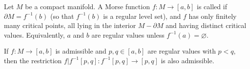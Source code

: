 Let $M$ be a compact manifold. A Morse function $f: M \rightarrow [a, b]$ is called  if $\partial M = f^{-1}(b)$ (so that $f^{-1}(b)$ is a regular level set), and $f$ has only finitely many critical points, all lying in the interior $M - \partial M$ and having distinct critical values. Equivalently, $a$ and $b$ are regular values unless $f^{-1}(a) = \varnothing$.

If $f: M \rightarrow [a, b]$ is admissible and $p, q \in [a, b]$ are regular values with $p < q$, then the restriction $f|f^{-1}[p, q]: f^{-1}[p, q] \rightarrow [p, q]$ is also admissible.
